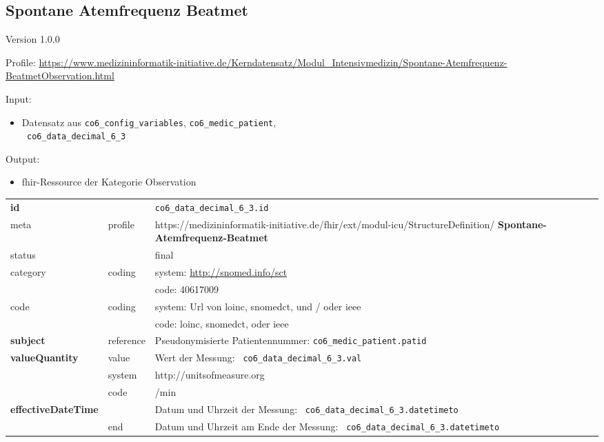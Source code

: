 \subsection{Spontane Atemfrequenz Beatmet} 
\noindent Version 1.0.0

\noindent Profile: \url{https://www.medizininformatik-initiative.de/Kerndatensatz/Modul_Intensivmedizin/Spontane-Atemfrequenz-BeatmetObservation.html}

\noindent Input:
\begin{itemize}
	\item Datensatz aus \texttt{co6\_config\_variables}, \texttt{co6\_medic\_patient}, \\ \texttt{
co6\_data\_decimal\_6\_3}
\end{itemize}
Output:
\begin{itemize}
        \item \ac{fhir}-Ressource der Kategorie \glqq Observation\grqq{}
\end{itemize}
\begin{longtable}{|l|l|p{7.5cm}|}
        \hline
        \rowcolor{lightgray} \multicolumn{3}{|l|}{Data Mapping (inhaltlich)} \\ \hline
        \textbf{id} &  & \texttt{co6\_data\_decimal\_6\_3.id} \\ \hline
	meta & profile & https://medizininformatik-initiative.de/fhir/ext/modul-icu/StructureDefinition/\textbf{
Spontane-Atemfrequenz-Beatmet} \\ \hline 
	status &  & final   \\ \hline 
	category & coding & system: \url{http://snomed.info/sct} \\
\cline{3-3}
	& & code: 40617009 \\ \hline
	code & coding & system: Url von \ac{loinc}, \ac{snomedct}, und / oder \ac{ieee} \\ 
	\cline{3-3} 
	 &  & code: \ac{loinc}, \ac{snomedct}, oder \ac{ieee} \\ \hline
	 \textbf{subject}  & reference & Pseudonymisierte Patientennummer: \texttt{co6\_medic\_patient.patid} \\ \hline
	 \textbf{valueQuantity}  & value & Wert der Messung: \texttt{
co6\_data\_decimal\_6\_3.val} \\
        \cline{2-3}
         & system & http://unitsofmeasure.org \\
         \cline{2-3}
         & code & /min \\ \hline
     \textbf{effectiveDateTime}  & & Datum und Uhrzeit der Messung: \texttt{
co6\_data\_decimal\_6\_3.datetimeto} \\
    \cline{2-3}
     & end & Datum und Uhrzeit am Ende der Messung: \texttt{
co6\_data\_decimal\_6\_3.datetimeto} \\ \hline
\end{longtable}


